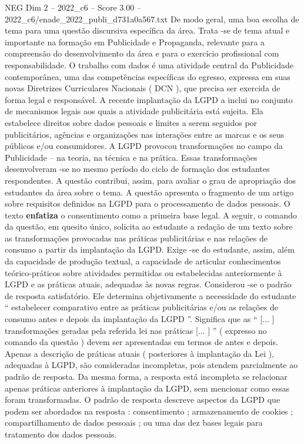 \begin{textsample}{NEG Dim 2 – 2022\_c6 – Score 3.00 – 2022\_c6/enade\_2022\_publi\_d731a0a567.txt}
De modo geral, uma boa escolha de tema para uma questão discursiva específica da área.
Trata -se de tema atual e importante na formação em Publicidade e Propaganda, relevante para a compreensão do desenvolvimento da área e para o exercício profissional com responsabilidade.
O trabalho com dados é uma atividade central da Publicidade contemporânea, uma das competências específicas do egresso, expressa em suas novas Diretrizes Curriculares Nacionais ( DCN ), que precisa ser exercida de forma legal e responsável.
A recente implantação da LGPD a inclui no conjunto de mecanismos legais aos quais a atividade publicitária está sujeita.
Ela estabelece direitos sobre dados pessoais e limites a serem seguidos por publicitários, agências e organizações nas interações entre as marcas e os seus públicos e/ou consumidores.
A LGPD provocou transformações no campo da Publicidade – na teoria, na técnica e na prática.
Essas transformações desenvolveram -se no mesmo período do ciclo de formação dos estudantes respondentes.
A questão contribui, assim, para avaliar o grau de apropriação dos estudantes da área sobre o tema.
A questão apresenta o fragmento de um artigo sobre requisitos definidos na LGPD para o processamento de dados pessoais.
O texto \textbf{enfatiza} o consentimento como a primeira base legal.
A seguir, o comando da questão, em quesito único, solicita ao estudante a redação de um texto sobre as transformações provocadas nas práticas publicitárias e nas relações de consumo a partir da implantação da LGPD.
Exige -se do estudante, assim, além da capacidade de produção textual, a capacidade de articular conhecimentos teórico-práticos sobre atividades permitidas ou estabelecidas anteriormente à LGPD e as práticas atuais, adequadas às novas regras.
Considerou -se o padrão de resposta satisfatório.
Ele determina objetivamente a necessidade do estudante “ estabelecer comparativo entre as práticas publicitárias e/ou as relações de consumo antes e depois da implantação da LGPD ”.
Significa que as “ [... ] transformações geradas pela referida lei nas práticas [... ] ” ( expresso no comando da questão ) devem ser apresentadas em termos de antes e depois.
Apenas a descrição de práticas atuais ( posteriores à implantação da Lei ), adequadas à LGPD, são consideradas incompletas, pois atendem parcialmente ao padrão de resposta.
Da mesma forma, a resposta está incompleta se relacionar apenas práticas anteriores à implantação da LGPD, sem mencionar como essas foram transformadas.
O padrão de resposta descreve aspectos da LGPD que podem ser abordados na resposta : consentimento ; armazenamento de cookies ; compartilhamento de dados pessoais ; ou uma das dez bases legais para tratamento dos dados pessoais.

\end{textsample}
